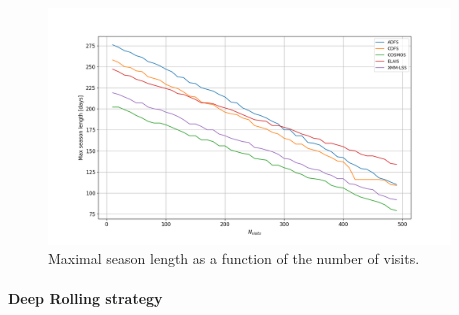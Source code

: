 \documentclass[\docopts]{\docclass}
\begin{document}
\begin{figure}[htbp]
\begin{center}
  \includegraphics[width=0.95\textwidth]{seasonlength_nvisits.png}
 \caption{Maximal season length as a function of the number of visits.}\label{fig:seasonlength_nvisits}
\end{center}
\end{figure}

\paragraph{Deep Rolling strategy}
\end{document}
